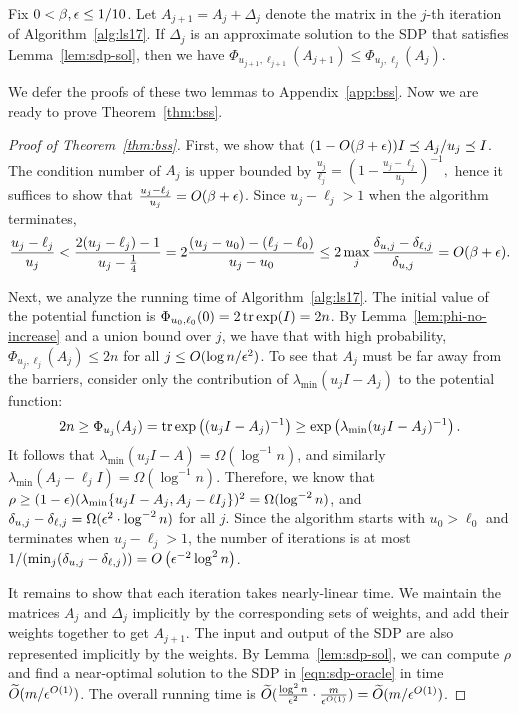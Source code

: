 \begin{lemma}
\label{lem:phi-no-increase}
Fix $0 < \beta, \epsilon \le 1/10$.
Let $A_{j+1} = A_j + \Delta_j$ denote the matrix in the $j$-th iteration of Algorithm~\ref{alg:ls17}.
If $\Delta_j$ is an approximate solution to the SDP that satisfies Lemma~\ref{lem:sdp-sol}, then we have $\Phi_{u_{j+1},\ell_{j+1}}(A_{j+1}) \le \Phi_{u_j,\ell_j}(A_{j})$.
\end{lemma}

We defer the proofs of these two lemmas to Appendix~\ref{app:bss}. Now we are ready to prove Theorem~\ref{thm:bss}.

\begin{proof}[Proof of Theorem~\ref{thm:bss}]
First, we show that $(1-O(\beta+\epsilon)) I \preceq A_j / u_j \preceq I$.
The condition number of $A_j$ is upper bounded by
$
\frac{u_j}{\ell_j} = \left(1-\frac{u_j-\ell_j}{u_j}\right)^{-1},
$
hence it suffices to show that $\frac{u_j-\ell_j}{u_j} = O(\beta + \epsilon)$.
Since $u_j - \ell_j > 1$ when the algorithm terminates,
\[
\frac{u_j - \ell_j}{u_j} < \frac{2(u_j - \ell_j) - 1}{u_j - \tfrac{1}{4}} = 2 \frac{(u_j - u_0) - (\ell_j - \ell_0)}{u_j - u_0}
  \le 2 \max_j\frac{\delta_{u,j} - \delta_{\ell,j}}{\delta_{u,j}} = O(\beta + \epsilon).
\]


Next, we analyze the running time of Algorithm~\ref{alg:ls17}.
The initial value of the potential function is $\Phi_{u_0, \ell_0}(0) = 2 \operatorname{tr} \exp (I) = 2n$.
By Lemma~\ref{lem:phi-no-increase} and a union bound over $j$, we have that with high probability, $\Phi_{u_j, \ell_j}(A_j) \le 2n$ for all $j \le O(\log n/\epsilon^2)$.
To see that $A_j$ must be far away from the barriers, consider only the contribution of $\lambda_{\min}(u_j I - A_j )$ to the potential function:
\[
2n \ge \Phi_{u_j}(A_j) = \operatorname{tr} \exp\left((u_j I - A_j)^{-1}\right) \ge \exp \left(\lambda_{\min}(u_j I - A_j)^{-1} \right).
\]
It follows that $\lambda_{\min}(u_j I - A) = \Omega(\log^{-1} n)$, and similarly $\lambda_{\min}(A_j - \ell_j I) = \Omega(\log^{-1} n)$.
Therefore, we know that $\rho \ge (1-\epsilon) (\lambda_{\min}\{u_j I - A_j, A_j - \ell I_j\})^2 = \Omega(\log^{-2} n)$, and $\delta_{u,j} - \delta_{\ell,j} = \Omega(\epsilon^2 \cdot \log^{-2} n)$ for all $j$.
Since the algorithm starts with $u_0 > \ell_0$ and terminates when $u_j - \ell_j > 1$, the number of iterations is at most $1/(\min_j (\delta_{u,j} - \delta_{\ell,j})) = O\left(\epsilon^{-2} \log^2 n \right)$.

It remains to show that each iteration takes nearly-linear time.
We maintain the matrices $A_j$ and $\Delta_j$ implicitly by the corresponding sets of weights, and add their weights together to get $A_{j+1}$. %
The input and output of the SDP are also represented implicitly by the weights.
By Lemma~\ref{lem:sdp-sol}, we can compute $\rho$ and find a near-optimal solution to the SDP in \eqref{eqn:sdp-oracle} in time $\widetilde O(m / \epsilon^{O(1)})$.
The overall running time is $\widetilde O(\frac{\log^2 n}{\epsilon^2} \cdot \frac{m}{\epsilon^{O(1)}}) = \widetilde O(m / \epsilon^{O(1)})$.
\end{proof}


